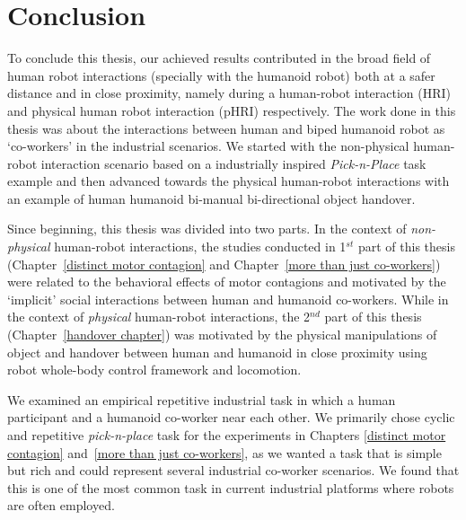 
{\color{blue}\chapter*{Conclusion}}
\pagestyle{plain}

To conclude this thesis, our achieved results contributed in the broad field of human robot interactions (specially with the humanoid robot) both at a safer distance and in close proximity, namely during a human-robot interaction (HRI) and physical human robot interaction (pHRI) respectively. The work done in this thesis was about the interactions between human and biped humanoid robot as `co-workers' in the industrial scenarios. We started with the non-physical human-robot interaction scenario based on a industrially inspired \textit{Pick-n-Place} task example and then advanced towards the physical human-robot interactions with an example of human humanoid bi-manual bi-directional object handover.

Since beginning, this thesis was divided into two parts. In the context of \textit{non-physical} human-robot interactions, the studies conducted in 1$^{st}$ part of this thesis (Chapter~\ref{distinct motor contagion} and Chapter~\ref{more than just co-workers}) were related to the behavioral effects of motor contagions and motivated by the `implicit' social interactions between human and humanoid co-workers. While in the context of \textit{physical} human-robot interactions, the 2$^{nd}$ part of this thesis (Chapter~\ref{handover chapter}) was motivated by the physical manipulations of object and handover between human and humanoid in close proximity using robot whole-body control framework and locomotion.

We examined an empirical repetitive industrial task in which a human participant and a humanoid co-worker near each other. We primarily chose cyclic and repetitive \textit{pick-n-place} task for the experiments in Chapters \ref{distinct motor contagion} and~\ref{more than just co-workers}, as we wanted a task that is simple but rich and could represent several industrial co-worker scenarios. We found that this is one of the most common task in current industrial platforms where robots are often employed.


